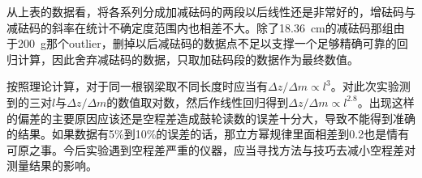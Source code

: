 \documentclass[UTF8]{ctexart}
\begin{document}
从上表的数据看，将各系列分成加减砝码的两段以后线性还是非常好的，增砝码与减砝码的斜率在统计不确定度范围内也相差不大。除了\SI{18.36}{\cm}的减砝码那组由于\SI{200}{\gram}那个outlier，删掉以后减砝码的数据点不足以支撑一个足够精确可靠的回归计算，因此舍弃减砝码的数据，只取加砝码段的数据作为最终数值。

按照理论计算，对于同一根钢梁取不同长度时应当有$\Delta z/\Delta m\propto l^3$。对此次实验测到的三对$l$与$\Delta z/\Delta m$的数值取对数，然后作线性回归得到$\Delta z/\Delta m\propto l^{2.8}$。出现这样的偏差的主要原因应该还是空程差造成鼓轮读数的误差十分大，导致不能得到准确的结果。如果数据有5\%到10\%的误差的话，那立方幂规律里面相差到0.2也是情有可原之事。今后实验遇到空程差严重的仪器，应当寻找方法与技巧去减小空程差对测量结果的影响。
\end{document}
